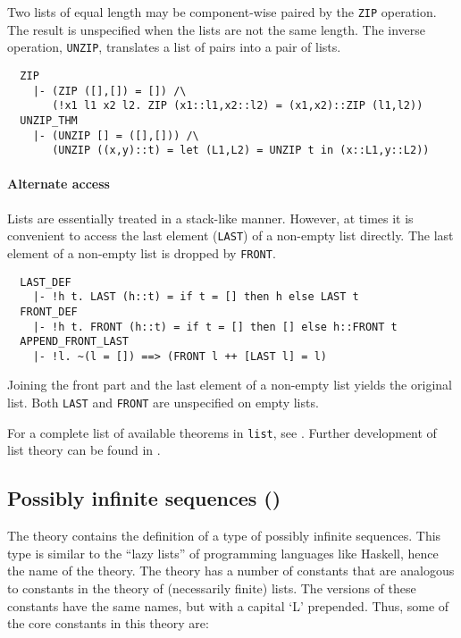 Two lists of equal length may be component-wise paired by
the {\small\verb+ZIP+} operation. The result is unspecified
when the lists are not the same length. The inverse operation,
{\small\verb+UNZIP+}, translates a list of pairs into a pair of
lists.
%
{\small
\begin{verbatim}
  ZIP
    |- (ZIP ([],[]) = []) /\
       (!x1 l1 x2 l2. ZIP (x1::l1,x2::l2) = (x1,x2)::ZIP (l1,l2))
  UNZIP_THM
    |- (UNZIP [] = ([],[])) /\
       (UNZIP ((x,y)::t) = let (L1,L2) = UNZIP t in (x::L1,y::L2))
\end{verbatim}
}

\paragraph {Alternate access}

Lists are essentially treated in a stack-like manner. However, at
times it is convenient to access the last element
({\small\verb+LAST+}) of a non-empty list directly. The last element
of a non-empty list is dropped by {\small\verb+FRONT+}.
%
{\small
\begin{verbatim}
  LAST_DEF
    |- !h t. LAST (h::t) = if t = [] then h else LAST t
  FRONT_DEF
    |- !h t. FRONT (h::t) = if t = [] then [] else h::FRONT t
  APPEND_FRONT_LAST
    |- !l. ~(l = []) ==> (FRONT l ++ [LAST l] = l)
\end{verbatim}
}
%
Joining the front part and the last element of a non-empty list yields
the original list.  Both {\small\verb+LAST+} and {\small\verb+FRONT+}
are unspecified on empty lists.

\noindent For a complete list of available theorems in
{\small\verb+list+}, see \REFERENCE.  Further development of list
theory can be found in \theoryimp{rich\_list}.


\subsection{Possibly infinite sequences (\theoryimp{llist})}

The theory  contains the definition of a type of
possibly infinite sequences.  This type is similar to the ``lazy
lists'' of programming languages like Haskell, hence the name of the
theory.  The  theory has a number of constants that
are analogous to constants in the theory of (necessarily finite)
lists.  The \theoryimp{llist} versions of these constants have the
same names, but with a capital `L\/' prepended.  Thus, some of the core
constants in this theory are:

